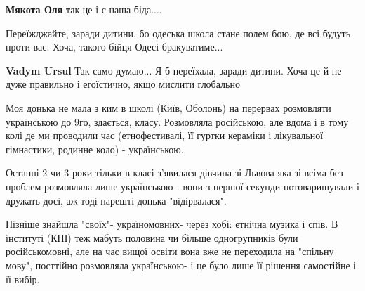 \begin{itemize}
\begin{itemize}
\textbf{Мякота Оля} так це і є наша біда....
\end{itemize}

 

Переїжджайте, заради дитини, бо одеська школа стане полем бою, де всі будуть
проти вас. Хоча, такого бійця Одесі бракуватиме...

\begin{itemize}
 
\textbf{Vadym Ursul} Так само думаю... Я б переїхала, заради дитини. Хоча це й не дуже правильно і егоїстично, якщо мислити глобально

 

Моя донька не мала з ким в школі (Київ, Оболонь) на перервах розмовляти
українською до 9го, здається, класу. Розмовляла російською, але вдома і в тому
колі де ми проводили час (етнофестивалі, її гуртки кераміки і лікувальної
гімнастики, родинне коло) - українською.

Останні 2 чи 3 роки тільки в класі з'явилася дівчина зі Львова яка зі всіма без
проблем розмовляла лише українською - вони з першої секунди потоваришували і
дружать досі, аж тоді нарешті донька "відірвалася".

Пізніше знайшла "своїх"- україномовних- через хобі: етнічна музика і спів. В
інституті (КПІ) теж мабуть половина чи більше одногрупників були
російськомовні, але на час вищої освіти вона вже не переходила на "спільну
мову", посттійно розмовляла українською- і це було лише її рішення самостійне і
її вибір.

 

\end{itemize}
\end{itemize}
